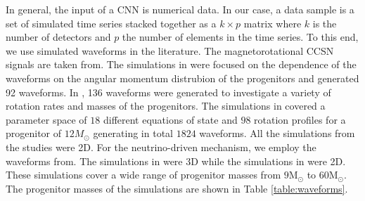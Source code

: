 \documentclass[aps,twocolumn,showpacs,groupedaddress, nofootinbib]{revtex4}  %
\begin{document}
In general, the input of a \ac{CNN} is numerical data.
In our case, a data sample is a set of simulated time series stacked together as a $k \times p$ matrix 
where $k$ is the number of detectors and $p$ the number of elements in the time series.
To this end, we use simulated waveforms in the literature.
The magnetorotational \ac{CCSN} signals are taken from\cite{abdikamalov2014measuring, dimmelmeier2008gravitational, richers2017equation}. 
The simulations in \cite{abdikamalov2014measuring} were focused on the dependence of the waveforms on the angular momentum distrubion of the progenitors and generated 92 waveforms.
In \cite{dimmelmeier2008gravitational}, 136 waveforms were generated to investigate a variety of rotation rates and masses of the progenitors.
The simulations in \cite{richers2017equation} covered a parameter space of $18$ different equations of state and $98$ rotation profiles for a progenitor of $12M_{\odot}$ generating in total $1824$ waveforms.
All the simulations from the studies were 2D.
For the neutrino-driven mechanism, we employ the waveforms from\cite{10.1093mnrasstz990, kuroda2017correlated, muller2012parametrized, powell2019gravitational, 
radice2019characterizing, yakunin2015gravitational, yakunin2017gravitational, ott2009gravitational, murphy2009model, ott2013general}.
The simulations in \cite{10.1093mnrasstz990, kuroda2017correlated, muller2012parametrized, powell2019gravitational, 
radice2019characterizing, yakunin2017gravitational} were 3D while the simulations in \cite{yakunin2015gravitational, ott2009gravitational, murphy2009model, ott2013general} were 2D.
These simulations cover a wide range of progenitor masses from $9\text{M}_\odot$ to $60\text{M}_\odot$.
The progenitor masses of the simulations are shown in Table \ref{table:waveforms}.
\end{document}

